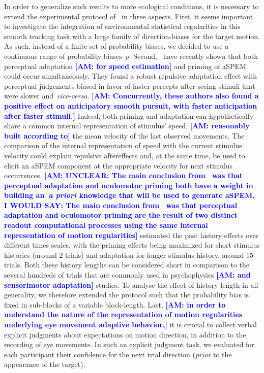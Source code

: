 \documentclass[12pt,english]{article}%
\newcommand{\citet}[1]{\textcite{#1}}
\newcommand{\seeFig}[1]{Figure~\ref{fig:#1}}
\newcommand{\seeSec}[1]{Section~\ref{sec:#1}}
\newcommand{\AM}[1]{\textbf{\textcolor{blue}{[AM: #1]}}}
\begin{document}
In order to generalize such results to more ecological conditions,
it is necessary to extend the experimental protocol of~\citet{Montagnini2010} in three aspects.
First, it seems important to investigate the integration of environmental statistical regularities
in this smooth tracking task with
a large family of direction-biases for the target motion.
As such, instead of a finite set of probability biases, %
we decided to use a continuous range of probability biases~$p$.
Second,~\citet{Maus2015} have recently shown that
both perceptual adaptation \AM{for speed estimation} and priming of aSPEM could occur simultaneously.
They found a robust repulsive adaptation effect
with perceptual judgements biased in favor of faster percepts
after seeing stimuli that were slower and~\textit{vice-versa}. \AM{Concurrently, these authors also found
a positive effect on anticipatory smooth pursuit, with faster anticipation after faster stimuli.}
Indeed, both priming and adaptation can hypothetically share
a common internal representation of stimulus' speed,
\AM{reasonably built according to} the mean velocity of the last observed movements.
The comparison of the internal representation of speed
with the current stimulus velocity could explain repulsive aftereffects and,
at the same time, be used to elicit
an aSPEM component at the appropriate velocity
for next stimulus occurrences.
\AM{UNCLEAR: The main conclusion from~\citet{Maus2015} was that
perceptual adaptation and oculomotor priming
both have a weight in building an~\textit{a priori} knowledge
that will be used to generate aSPEM. I WOULD SAY: The main conclusion from~\citet{Maus2015} was that
perceptual adaptation and oculomotor priming
are the result of two distinct readout computational processes using the same internal representation of motion regularities}
\citet{Maus2015} estimated the past history effects over different times scales,
with the priming effects being maximized
for short stimulus histories (around $2$ trials) and
adaptation for longer stimulus history, around $15$ trials.
Both these history lengths can be considered
short in comparison to the several hundreds
of trials that are commonly used in psychophysics \AM{and sensorimotor adaptation} studies.
To analyse the effect of history length in all generality,
we therefore extended the protocol such that the probability bias
is fixed in sub-blocks of a variable block-length.
Last, \AM{in order to understand the nature of the representation of motion regularities underlying eye movement adaptive behavior,} it is crucial to collect verbal explicit judgments about expectations on motion direction, in addition to the recording of eye movements.
In such an explicit judgment task, we evaluated for each participant their confidence for the next trial direction
(\emph{prior} to the appearance of the target).
\end{document}
